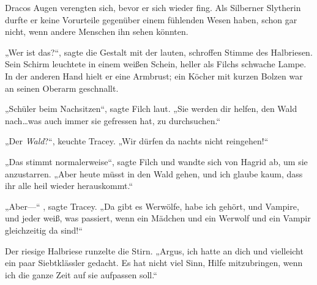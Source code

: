 Dracos Augen verengten sich, bevor er sich wieder fing. Als Silberner Slytherin durfte er keine Vorurteile gegenüber einem fühlenden Wesen haben, schon gar nicht, wenn andere Menschen ihn sehen könnten.

„Wer ist das?“, sagte die Gestalt mit der lauten, schroffen Stimme des Halbriesen. Sein Schirm leuchtete in einem weißen Schein, heller als Filchs schwache Lampe. In der anderen Hand hielt er eine Armbrust; ein Köcher mit kurzen Bolzen war an seinen Oberarm geschnallt.

„Schüler beim Nachsitzen“, sagte Filch laut. „Sie werden dir helfen, den Wald nach…was auch immer sie gefressen hat, zu durchsuchen.“

„Der \emph{Wald}?“, keuchte Tracey. „Wir dürfen da nachts nicht reingehen!“

„Das stimmt normalerweise“, sagte Filch und wandte sich von Hagrid ab, um sie anzustarren. „Aber heute müsst in den Wald gehen, und ich glaube kaum, dass ihr alle heil wieder herauskommt.“

„Aber—“ , sagte Tracey. „Da gibt es Werwölfe, habe ich gehört, und Vampire, und jeder weiß, was passiert, wenn ein Mädchen und ein Werwolf und ein Vampir gleichzeitig da sind!“

Der riesige Halbriese runzelte die Stirn. „Argus, ich hatte an dich und vielleicht ein paar Siebtklässler gedacht. Es hat nicht viel Sinn, Hilfe mitzubringen, wenn ich die ganze Zeit auf sie aufpassen soll.“

